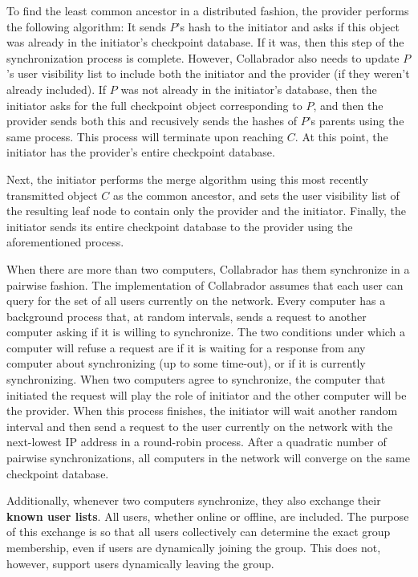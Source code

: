 \documentclass[11pt,titlepage]{article}
\begin{document}
To find the least common ancestor in a distributed fashion, the provider performs the following algorithm: It sends $P$'s hash to the initiator and asks if this object was already in the initiator's checkpoint database. If it was, then this step of the synchronization process is complete. However, Collabrador also needs to update $P$'s user visibility list to include both the initiator and the provider (if they weren't already included). If $P$ was not already in the initiator's database, then the initiator asks for the full checkpoint object corresponding to $P$, and then the provider sends both this and recusively sends the hashes of $P$'s parents using the same process. This process will terminate upon reaching $C$. At this point, the initiator has the provider's entire checkpoint database.

Next, the initiator performs the merge algorithm using this most recently transmitted object $C$ as the common ancestor, and sets the user visibility list of the resulting leaf node to contain only the provider and the initiator. Finally, the initiator sends its entire checkpoint database to the provider using the aforementioned process.

When there are more than two computers, Collabrador has them synchronize in a pairwise fashion. The implementation of Collabrador assumes that each user can query for the set of all users currently on the network. Every computer has a background process that, at random intervals, sends a request to another computer asking if it is willing to synchronize. The two conditions under which a computer will refuse a request are if it is waiting for a response from any computer about synchronizing (up to some time-out), or if it is currently synchronizing. When two computers agree to synchronize, the computer that initiated the request will play the role of initiator and the other computer will be the provider. When this process finishes, the initiator will wait another random interval and then send a request to the user currently on the network with the next-lowest IP address in a round-robin process. After a quadratic number of pairwise synchronizations, all computers in the network will converge on the same checkpoint database.

Additionally, whenever two computers synchronize, they also exchange their \textbf{known user lists}. All users, whether online or offline, are included. The purpose of this exchange is so that all users collectively can determine the exact group membership, even if users are dynamically joining the group. This does not, however, support users dynamically leaving the group.
\end{document}
